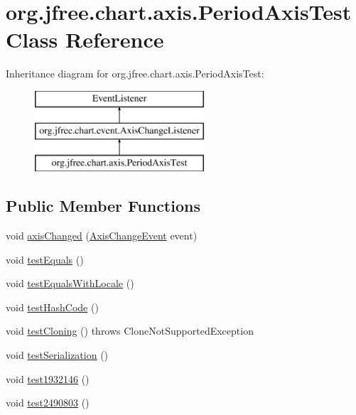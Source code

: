 \hypertarget{classorg_1_1jfree_1_1chart_1_1axis_1_1_period_axis_test}{}\section{org.\+jfree.\+chart.\+axis.\+Period\+Axis\+Test Class Reference}
\label{classorg_1_1jfree_1_1chart_1_1axis_1_1_period_axis_test}
Inheritance diagram for org.\+jfree.\+chart.\+axis.\+Period\+Axis\+Test\+:\begin{figure}[H]
\begin{center}
\leavevmode
\includegraphics[height=3.000000cm]{classorg_1_1jfree_1_1chart_1_1axis_1_1_period_axis_test}
\end{center}
\end{figure}
\subsection*{Public Member Functions}
\begin{DoxyCompactItemize}
\item 
void \mbox{\hyperlink{classorg_1_1jfree_1_1chart_1_1axis_1_1_period_axis_test_a951dc996bd0b09bd930878a5e2041cad}{axis\+Changed}} (\mbox{\hyperlink{classorg_1_1jfree_1_1chart_1_1event_1_1_axis_change_event}{Axis\+Change\+Event}} event)
\item 
void \mbox{\hyperlink{classorg_1_1jfree_1_1chart_1_1axis_1_1_period_axis_test_a6175c2ecd392e22a0ee1167e234eb797}{test\+Equals}} ()
\item 
void \mbox{\hyperlink{classorg_1_1jfree_1_1chart_1_1axis_1_1_period_axis_test_ae7e94eaf40cf0b9fad22eb82858967a9}{test\+Equals\+With\+Locale}} ()
\item 
void \mbox{\hyperlink{classorg_1_1jfree_1_1chart_1_1axis_1_1_period_axis_test_a6ccc45e3516104b0c0cd615a6ab815c6}{test\+Hash\+Code}} ()
\item 
void \mbox{\hyperlink{classorg_1_1jfree_1_1chart_1_1axis_1_1_period_axis_test_af5e00b43b6ba33f735d5b3e2039d0448}{test\+Cloning}} ()  throws Clone\+Not\+Supported\+Exception 
\item 
void \mbox{\hyperlink{classorg_1_1jfree_1_1chart_1_1axis_1_1_period_axis_test_a56ccc12e886ed7b1acb82e4f6ad34fc9}{test\+Serialization}} ()
\item 
void \mbox{\hyperlink{classorg_1_1jfree_1_1chart_1_1axis_1_1_period_axis_test_a3fbfdadadb8f0b87f73a911d3ca342a3}{test1932146}} ()
\item 
void \mbox{\hyperlink{classorg_1_1jfree_1_1chart_1_1axis_1_1_period_axis_test_a7fa2b02261f355362cb5b20fe534b4f2}{test2490803}} ()
\end{DoxyCompactItemize}


